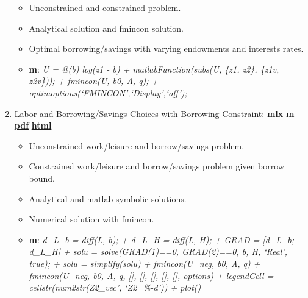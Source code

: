\documentclass[
]{book}
\providecommand{\tightlist}{%
  \setlength{\itemsep}{0pt}\setlength{\parskip}{0pt}}
\begin{document}
\begin{enumerate}
  \begin{itemize}
  \tightlist
  \item
    Unconstrained and constrained problem.
  \item
    Analytical solution and fmincon solution.
  \item
    Optimal borrowing/savings with varying endowments and interests rates.
  \item
    \textbf{m}: \emph{U = @(b) log(z1 - b) + matlabFunction(subs(U, \{z1, z2\}, \{z1v, z2v\})); + fmincon(U, b0, A, q); + optimoptions(`FMINCON',`Display',`off');}
  \end{itemize}
\item
  \href{https://fanwangecon.github.io/Math4Econ/opti_hh_constrained_brsv_inequality/htmlpdfm/household_asset_labor_constrained.html}{Labor and Borrowing/Savings Choices with Borrowing Constraint}: \href{https://github.com/FanWangEcon/Math4Econ/blob/master/opti_hh_constrained_brsv_inequality/household_asset_labor_constrained.mlx}{\textbf{mlx}} \textbar{} \href{https://github.com/FanWangEcon/Math4Econ/blob/master/opti_hh_constrained_brsv_inequality/htmlpdfm/household_asset_labor_constrained.m}{\textbf{m}} \textbar{} \href{https://github.com/FanWangEcon/Math4Econ/blob/master/opti_hh_constrained_brsv_inequality/htmlpdfm/household_asset_labor_constrained.pdf}{\textbf{pdf}} \textbar{} \href{https://fanwangecon.github.io/Math4Econ/opti_hh_constrained_brsv_inequality/htmlpdfm/household_asset_labor_constrained.html}{\textbf{html}}

  \begin{itemize}
  \tightlist
  \item
    Unconstrained work/leisure and borrow/savings problem.
  \item
    Constrained work/leisure and borrow/savings problem given borrow bound.
  \item
    Analytical and matlab symbolic solutions.
  \item
    Numerical solution with fmincon.
  \item
    \textbf{m}: \emph{d\_L\_b = diff(L, b); + d\_L\_H = diff(L, H); + GRAD = {[}d\_L\_b; d\_L\_H{]} + solu = solve(GRAD(1)==0, GRAD(2)==0, b, H, `Real', true); + solu = simplify(solu) + fmincon(U\_neg, b0, A, q) + fmincon(U\_neg, b0, A, q, {[}{]}, {[}{]}, {[}{]}, {[}{]}, {[}{]}, options) + legendCell = cellstr(num2str(Z2\_vec', `Z2=\%-d')) + plot()}
  \end{itemize}
\end{enumerate}
\end{document}

